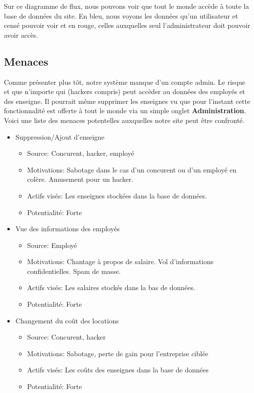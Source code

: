 \documentclass[a4paper]{article}
\begin{document}
Sur ce diagramme de flux, nous pouvons voir que tout le monde accède à toute la base de données du site. En bleu, nous voyons les données qu'un utilisateur et censé pouvoir voir et en rouge, celles auxquelles seul l'administrateur doit pouvoir avoir accès.

\subsection{Menaces}
Comme présenter plus tôt, notre système manque d'un compte admin. Le risque et que n'importe qui (hackers compris) peut accèder au données des employés et des enseigne. Il pourrait même supprimer les enseignes vu que pour l'instant cette fonctionnalité est offerte à tout le monde via un simple onglet \textbf{Administration}.\\
Voici une liste des menaces potentelles auxquelles notre site peut être confronté.
\begin{itemize}

\item Suppression/Ajout d'enseigne
\begin{itemize}
\item Source: Concurent, hacker, employé
\item Motivations: Sabotage dans le cas d'un concurent ou d'un employé en colère. Amusement pour un hacker.
\item Actifs visés: Les enseignes stockées dans la base de données.
\item Potentialité: Forte
\end{itemize}

\item Vue des informations des employés
\begin{itemize}
\item Source:  Employé
\item Motivations: Chantage à propos de salaire. Vol d'informations confidentielles. Spam de masse.
\item Actifs visés: Les salaires stockés dans la bas de données.
\item Potentialité: Forte
\end{itemize}

\item Changement du coût des locations
\begin{itemize}
\item Source: Concurent, hacker
\item Motivations: Sabotage, perte de gain pour l'entreprise ciblée
\item Actifs visés: Les coûts des enseignes dans la base de données
\item Potentialité: Forte
\end{itemize}

\end{itemize}
\end{document}
